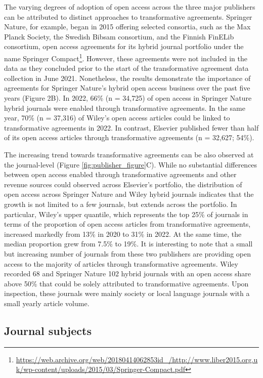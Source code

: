\documentclass[a4paper,man,floatsintext,longtable,noextraspace,12pt]{apa6}
\begin{document}
The varying degrees of adoption of open access across the three major
publishers can be attributed to distinct approaches to transformative
agreements. Springer Nature, for example, began in 2015 offering
selected consortia, such as the Max Planck Society, the Swedish Bibsam
consortium, and the Finnish FinELib consortium, open access agreements
for its hybrid journal portfolio under the name Springer
Compact\footnote{\url{https://web.archive.org/web/20180414062853id_/http://www.liber2015.org.uk/wp-content/uploads/2015/03/Springer-Compact.pdf}}.
However, these agreements were not included in the data as they
concluded prior to the start of the transformative agreement data
collection in June 2021. Nonetheless, the results demonstrate the
importance of agreements for Springer Nature's hybrid open access
business over the past five years (Figure 2B). In 2022, 66\% (n =
34,725) of open access in Springer Nature hybrid journals were enabled
through transformative agreements. In the same year, 70\% (n = 37,316)
of Wiley's open access articles could be linked to transformative
agreements in 2022. In contrast, Elsevier published fewer than half of
its open access articles through transformative agreements (n = 32,627;
54\%).

The increasing trend towards transformative agreements can be also
observed at the journal-level (Figure \ref{fig:publisher_figure}C).
While no substantial differences between open access enabled through
transformative agreements and other revenue sources could observed
across Elsevier's portfolio, the distribution of open access across
Springer Nature and Wiley hybrid journals indicates that the growth is
not limited to a few journals, but extends across the portfolio. In
particular, Wiley's upper quantile, which represents the top 25\% of
journals in terms of the proportion of open access articles from
transformative agreements, increased markedly from 13\% in 2020 to 31\%
in 2022. At the same time, the median proportion grew from 7.5\% to
19\%. It is interesting to note that a small but increasing number of
journals from these two publishers are providing open access to the
majority of articles through transformative agreements. Wiley recorded
68 and Springer Nature 102 hybrid journals with an open access share
above 50\% that could be solely attributed to transformative agreements.
Upon inspection, these journals were mainly society or local language
journals with a small yearly article volume.

\hypertarget{journal-subjects}{%
\subsection{Journal subjects}\label{journal-subjects}}
\end{document}
